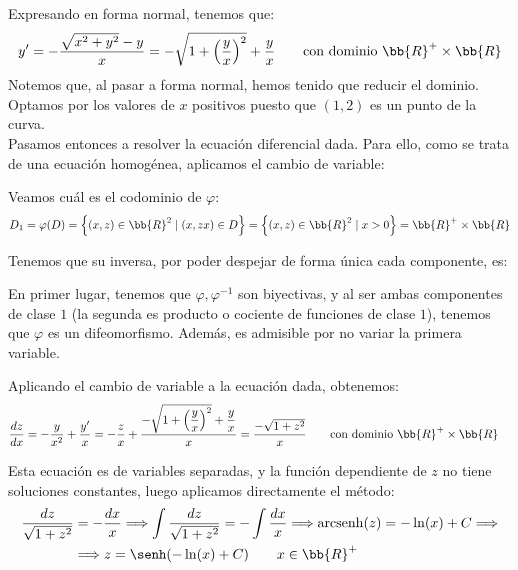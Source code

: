 \begin{ejercicio}
    Expresando en forma normal, tenemos que:
    \begin{align*}
        y'=-\dfrac{\sqrt{x^2+y^2}-y}{x}
        =-\sqrt{1+\left(\dfrac{y}{x}\right)^2}+\dfrac{y}{x} \qquad \text{con dominio }\bb{R}^+\times \bb{R}
    \end{align*}
    Notemos que, al pasar a forma normal, hemos tenido que reducir el dominio. Optamos por los valores de $x$ positivos puesto que $(1,2)$ es un punto de la curva.\\

    Pasamos entonces a resolver la ecuación diferencial dada. Para ello, como se trata de una ecuación homogénea, aplicamos el cambio de variable:

    Veamos cuál es el codominio de $\varphi$:
    \begin{equation*}
        D_1=\varphi(D) = \left\{(x,z)\in \bb{R}^2 \mid (x, zx)\in D\right\} = \left\{(x,z)\in \bb{R}^2 \mid x>0 \right\}
        = \bb{R}^+\times \bb{R}
    \end{equation*}

    Tenemos que su inversa, por poder despejar de forma única cada componente, es:

    En primer lugar, tenemos que $\varphi,\varphi^{-1}$ son biyectivas, y al ser ambas componentes de clase $1$ (la segunda es producto o cociente de funciones de clase $1$), tenemos que $\varphi$ es un difeomorfismo. Además, es admisible por no variar la primera variable.

    Aplicando el cambio de variable a la ecuación dada, obtenemos:
    \begin{align*}
        \dfrac{dz}{dx} & = -\dfrac{y}{x^2} + \dfrac{y'}{x}
        = -\dfrac{z}{x} + \dfrac{-\sqrt{1+\left(\dfrac{y}{x}\right)^2}+\dfrac{y}{x}}{x} = \dfrac{-\sqrt{1+z^2}}{x} \qquad \text{con dominio }\bb{R}^+\times \bb{R}
    \end{align*}

    Esta ecuación es de variables separadas, y la función dependiente de $z$ no tiene soluciones constantes, luego aplicamos directamente el método:
    \begin{align*}
        \dfrac{dz}{\sqrt{1+z^2}} &= -\dfrac{dx}{x} \Longrightarrow \int \dfrac{dz}{\sqrt{1+z^2}} = -\int \dfrac{dx}{x} \Longrightarrow \operatorname{arcsenh}(z) = -\ln(x) + C \Longrightarrow\\&\Longrightarrow z = \senh(-\ln(x) + C) \qquad x\in \bb{R}^+
    \end{align*}


\end{ejercicio}
